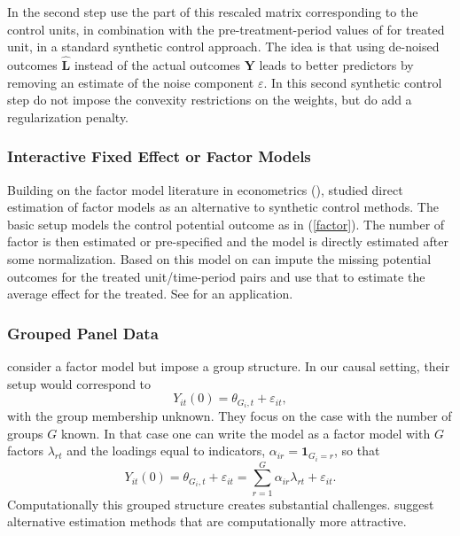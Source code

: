 \documentclass[letterpaper,12pt,leqno]{article}
\begin{document}
In the second step \citep*{amjad2018robust} use the part of this rescaled matrix corresponding to the control units, in combination with the pre-treatment-period values of for treated unit, in a standard synthetic control approach. The idea is that using de-noised outcomes $\hat{\mathbf{L}}$ instead of the actual  outcomes $\mathbf{Y}$ leads to better predictors by removing an estimate of  the noise component $\varepsilon$. In this second synthetic control step \citep*{amjad2018robust} do not impose the convexity restrictions on the weights, but do add a regularization penalty.


\subsubsection{Interactive Fixed Effect or Factor  Models}

Building on the factor model literature in econometrics (\citealp*{chamberlain1983arbitrage,holtz1988estimating,chamberlain1992efficiency, pesaran2006estimation, bai2009panel, moon2015linear, moon2018nuclear,freyberger2018non}), 
\citep{xu2017generalized}
studied direct estimation of factor models as an alternative to synthetic control methods. 
The basic setup models the control potential outcome as in (\ref{factor}).
The number of factor is then estimated or pre-specified and the model is directly estimated after some normalization. Based on this model on can impute the missing potential outcomes for the treated unit/time-period pairs and use that to estimate the average effect for the treated.
See \citep*{gobillon2016regional} for an application.



\subsubsection{Grouped Panel Data}

\citep{bonhomme2015grouped, bonhomme2022discretizing}
consider a factor model but impose a group structure. In our causal setting, their setup would correspond to
\[ Y_{it}(0)=\theta_{G_i,t}+\varepsilon_{it},\]
with the group membership unknown. They focus on the case with the number of groups $G$ known.
In that case one can write the model as a factor model with $G$ factors $\lambda_{rt}$ and the loadings equal to indicators, $\alpha_{ir}=\mathbf{1}_{G_i=r}$, so that
\[ Y_{it}(0)=\theta_{G_i,t}+\varepsilon_{it}
=\sum_{r=1}^G \alpha_{ir}\lambda_{rt}+\varepsilon_{it}.\]
Computationally this grouped structure creates substantial challenges.  \citep{mugnier2022make, chetverikov2022spectral} suggest alternative estimation methods that are computationally more attractive. 
\end{document}
